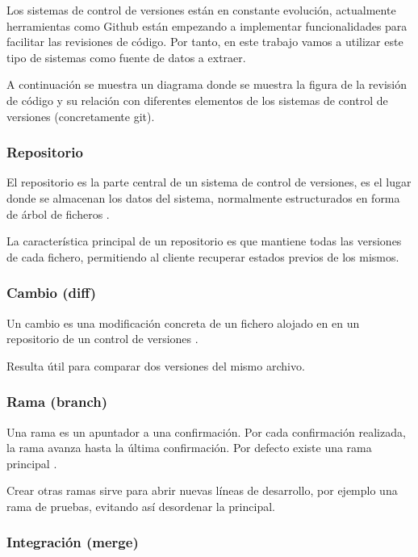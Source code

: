 Los sistemas de control de versiones están en constante evolución, actualmente herramientas como Github están empezando a implementar funcionalidades para facilitar  las revisiones de código. Por tanto, en este trabajo vamos a utilizar este tipo de sistemas como fuente de datos a extraer.

A continuación se muestra un diagrama donde se muestra la figura de la revisión de código y su relación con diferentes elementos de los sistemas de control de versiones (concretamente git).


\subsubsection{Repositorio}

El repositorio es la parte central de un sistema de control de versiones, es el lugar donde se almacenan los datos del sistema, normalmente estructurados en forma de árbol de ficheros \cite{Pilato:2008:VCS:1435405}.

La característica principal de un repositorio es que mantiene todas las versiones de cada fichero, permitiendo al cliente recuperar estados previos de los mismos.

\subsubsection{Cambio (diff)}

Un cambio es una modificación concreta de un fichero alojado en en un repositorio de un control de versiones \cite{wiki:002}.

Resulta útil para comparar dos versiones del mismo archivo.

\subsubsection{Rama (branch)}

Una rama es un apuntador a una confirmación. Por cada confirmación realizada, la rama avanza hasta la última confirmación. Por defecto existe una rama principal \cite{Chacon:2014:PG:2695634}. 

Crear otras ramas sirve para abrir nuevas líneas de desarrollo, por ejemplo una rama de pruebas, evitando así desordenar la principal.

\subsubsection{Integración (merge)}

